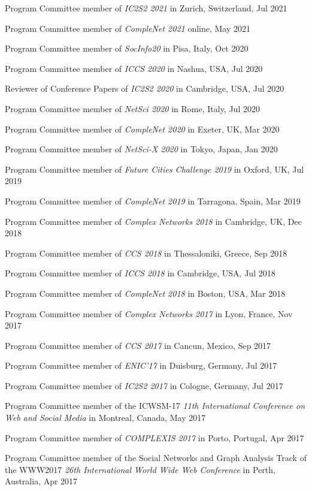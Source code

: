 \documentclass[10pt,a4paper]{article}
\renewenvironment{itemize}{
  \begin{list}{}{
    \setlength{\leftmargin}{1.5em}
    \setlength{\itemsep}{0.25em}
    \setlength{\parskip}{0pt}
    \setlength{\parsep}{0.25em}
  }
}{
  \end{list}
}
\begin{document}
\begin{itemize}
\item{Program Committee member of \emph{IC2S2 2021} in Zurich, Switzerland, Jul 2021}
\item{Program Committee member of \emph{CompleNet 2021} online, May 2021}
\item{Program Committee member of \emph{SocInfo20} in Pisa, Italy, Oct 2020}
\item{Program Committee member of \emph{ICCS 2020} in Nashua, USA, Jul 2020}
\item{Reviewer of Conference Papers of \emph{IC2S2 2020} in Cambridge, USA, Jul 2020}
\item{Program Committee member of \emph{NetSci 2020} in Rome, Italy, Jul 2020}
\item{Program Committee member of \emph{CompleNet 2020} in Exeter, UK, Mar 2020}
\item{Program Committee member of \emph{NetSci-X 2020} in Tokyo, Japan, Jan 2020}
\item{Program Committee member of \emph{Future Cities Challenge 2019} in Oxford, UK, Jul 2019}
\item{Program Committee member of \emph{CompleNet 2019} in Tarragona, Spain, Mar 2019}
\item{Program Committee member of \emph{Complex Networks 2018} in Cambridge, UK, Dec 2018}
\item{Program Committee member of \emph{CCS 2018} in Thessaloniki, Greece, Sep 2018}
\item{Program Committee member of \emph{ICCS 2018} in Cambridge, USA, Jul 2018}
\item{Program Committee member of \emph{CompleNet 2018} in Boston, USA, Mar 2018}
\item{Program Committee member of \emph{Complex Networks 2017} in Lyon, France, Nov 2017}
\item{Program Committee member of \emph{CCS 2017} in Cancun, Mexico, Sep 2017}
\item{Program Committee member of \emph{ENIC'17} in Duisburg, Germany, Jul 2017}
\item{Program Committee member of \emph{IC2S2 2017} in Cologne, Germany, Jul 2017}
\item{Program Committee member of the ICWSM-17 \emph{11th International Conference on Web and Social Media} in Montreal, Canada, May 2017} 
\item{Program Committee member of \emph{COMPLEXIS 2017} in Porto, Portugal, Apr 2017} 
\item{Program Committee member of the Social Networks and Graph Analysis Track of the WWW2017 \emph{26th International World Wide Web Conference} in Perth, Australia, Apr 2017} 

\end{itemize}
\end{document}
